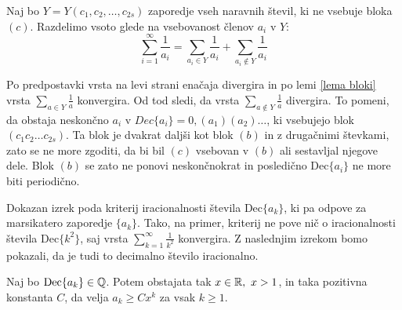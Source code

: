 \documentclass[twoside,11pt]{article}
\begin{document}
Naj bo $Y = Y(c_1, c_2, \dots, c_{2s})$ zaporedje vseh naravnih števil, 
ki ne vsebuje bloka $(c)$.
Razdelimo vsoto glede na vsebovanost členov $a_i$ v $Y$:
\[
    \sum_{i=1}^{\infty} \frac{1}{a_i} = \sum_{a_i \in Y}\frac{1}{a_i} + \sum_{a_i \notin Y} \frac{1}{a_i}
    \]

Po predpostavki vrsta na levi strani enačaja divergira in po lemi \ref{lema bloki} vrsta $\sum_{a \in Y}\frac{1}{a}$
konvergira. Od tod sledi, da vrsta $\sum_{a \notin Y} \frac{1}{a}$ divergira.
To pomeni, da obstaja neskončno $a_i$ v $Dec\{a_i\} = 0{,}(a_1)(a_2) \dots$, ki vsebujejo blok 
$(c_1c_2\dots c_{2s})$. Ta blok je dvakrat daljši kot blok $(b)$ in z drugačnimi števkami, zato se ne more
zgoditi, da bi bil $(c)$ vsebovan v $(b)$ ali sestavljal njegove dele. 
Blok $(b)$ se zato ne ponovi neskončnokrat in posledično $\text{Dec}\{a_i\}$ ne more biti periodično.
\QED


Dokazan izrek poda kriterij iracionalnosti števila $\text{Dec}\{a_k\}$,
ki pa odpove za marsikatero zaporedje $\{a_k\}$.
Tako, na primer, kriterij ne pove nič o iracionalnosti števila $\text{Dec}\{k^2\}$, saj vrsta $\sum_{k=1}^{\infty}\frac{1}{k^2}$ konvergira.
Z naslednjim izrekom bomo pokazali, da je tudi to decimalno število iracionalno.

%
%


\begin{izrek}
    \label{izrek1clanek2}
    Naj bo $\text{Dec}\{a_k\} \in \mathbb{Q}$. Potem obstajata tak $x \in \mathbb{R}, \ x > 1$, in taka pozitivna konstanta $C$,
    da velja $a_k \geq Cx^k$ za vsak $k \geq 1$.
\end{izrek}
\end{document}
